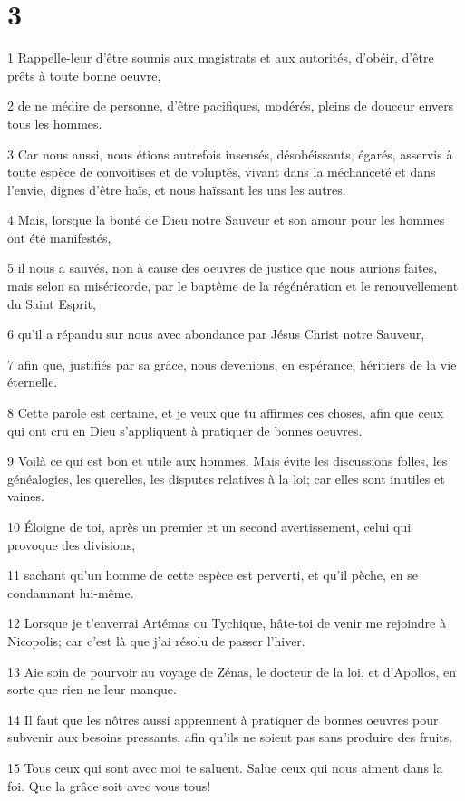 \chapter{3}

\par 1 Rappelle-leur d'être soumis aux magistrats et aux autorités, d'obéir, d'être prêts à toute bonne oeuvre,
\par 2 de ne médire de personne, d'être pacifiques, modérés, pleins de douceur envers tous les hommes.
\par 3 Car nous aussi, nous étions autrefois insensés, désobéissants, égarés, asservis à toute espèce de convoitises et de voluptés, vivant dans la méchanceté et dans l'envie, dignes d'être haïs, et nous haïssant les uns les autres.
\par 4 Mais, lorsque la bonté de Dieu notre Sauveur et son amour pour les hommes ont été manifestés,
\par 5 il nous a sauvés, non à cause des oeuvres de justice que nous aurions faites, mais selon sa miséricorde, par le baptême de la régénération et le renouvellement du Saint Esprit,
\par 6 qu'il a répandu sur nous avec abondance par Jésus Christ notre Sauveur,
\par 7 afin que, justifiés par sa grâce, nous devenions, en espérance, héritiers de la vie éternelle.
\par 8 Cette parole est certaine, et je veux que tu affirmes ces choses, afin que ceux qui ont cru en Dieu s'appliquent à pratiquer de bonnes oeuvres.
\par 9 Voilà ce qui est bon et utile aux hommes. Mais évite les discussions folles, les généalogies, les querelles, les disputes relatives à la loi; car elles sont inutiles et vaines.
\par 10 Éloigne de toi, après un premier et un second avertissement, celui qui provoque des divisions,
\par 11 sachant qu'un homme de cette espèce est perverti, et qu'il pèche, en se condamnant lui-même.
\par 12 Lorsque je t'enverrai Artémas ou Tychique, hâte-toi de venir me rejoindre à Nicopolis; car c'est là que j'ai résolu de passer l'hiver.
\par 13 Aie soin de pourvoir au voyage de Zénas, le docteur de la loi, et d'Apollos, en sorte que rien ne leur manque.
\par 14 Il faut que les nôtres aussi apprennent à pratiquer de bonnes oeuvres pour subvenir aux besoins pressants, afin qu'ils ne soient pas sans produire des fruits.
\par 15 Tous ceux qui sont avec moi te saluent. Salue ceux qui nous aiment dans la foi. Que la grâce soit avec vous tous!


